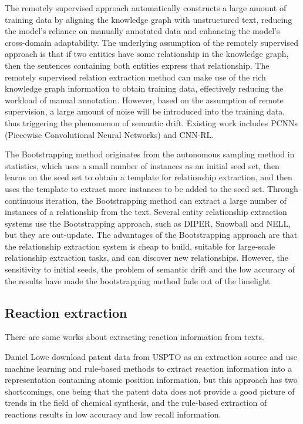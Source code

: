 \documentclass[%
 aip,
 jmp,%
 amsmath,amssymb,
 reprint,%
]{revtex4-2}
\begin{document}
The remotely supervised approach automatically constructs a large amount of training data by 
aligning the knowledge graph with unstructured text, reducing the model's reliance on manually 
annotated data and enhancing the model's cross-domain adaptability. The underlying assumption 
of the remotely supervised approach is that if two entities have some relationship in the knowledge graph, 
then the sentences containing both entities express that relationship. The remotely supervised relation 
extraction method can make use of the rich knowledge graph information to obtain training data, 
effectively reducing the workload of manual annotation. However, based on the assumption of 
remote supervision, a large amount of noise will be introduced into the training data, 
thus triggering the phenomenon of semantic drift. Existing work includes PCNNs (Piecewise Convolutional Neural Networks) and
CNN-RL.

The Bootstrapping method originates from the autonomous sampling method in statistics, 
which uses a small number of instances as an initial seed set, then learns on the seed set 
to obtain a template for relationship extraction, and then uses the template to extract more instances 
to be added to the seed set. Through continuous iteration, the Bootstrapping method can extract 
a large number of instances of a relationship from the text. Several entity relationship extraction 
systems use the Bootstrapping approach, such as DIPER, Snowball and NELL, but they are out-update. 
The advantages of the Bootstrapping approach are that the relationship extraction system is cheap to build, 
suitable for large-scale relationship extraction tasks, and can discover new relationships. 
However, the sensitivity to initial seeds, the problem of semantic drift and the low accuracy of the 
results have made the bootstrapping method fade out of the limelight.

\subsection{Reaction extraction}
There are some works about extracting reaction information from texts.

Daniel Lowe download patent data from USPTO as an extraction source and use machine learning and rule-based 
methods to extract reaction information into a representation containing atomic position information, 
but this approach has two shortcomings, one being that the patent data does not provide a good picture 
of trends in the field of chemical synthesis, and the rule-based extraction of reactions results in 
low accuracy and low recall information.
\end{document}
